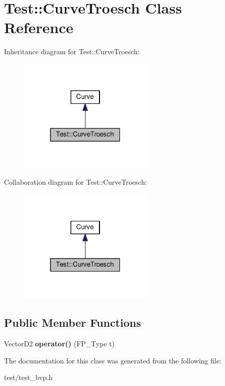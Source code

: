 \hypertarget{classTest_1_1CurveTroesch}{}\section{Test\+:\+:Curve\+Troesch Class Reference}
\label{classTest_1_1CurveTroesch}


Inheritance diagram for Test\+:\+:Curve\+Troesch\+:
\nopagebreak
\begin{figure}[H]
\begin{center}
\leavevmode
\includegraphics[width=184pt]{classTest_1_1CurveTroesch__inherit__graph}
\end{center}
\end{figure}


Collaboration diagram for Test\+:\+:Curve\+Troesch\+:
\nopagebreak
\begin{figure}[H]
\begin{center}
\leavevmode
\includegraphics[width=184pt]{classTest_1_1CurveTroesch__coll__graph}
\end{center}
\end{figure}
\subsection*{Public Member Functions}
\begin{DoxyCompactItemize}
\item 
\mbox{\label{classTest_1_1CurveTroesch_a1b9232e93831fa367a4b3cc6f3ad8bcc}} 
Vector\+D2 {\bfseries operator()} (F\+P\+\_\+\+Type t)
\end{DoxyCompactItemize}


The documentation for this class was generated from the following file\+:\begin{DoxyCompactItemize}
\item 
test/test\+\_\+bvp.\+h\end{DoxyCompactItemize}
